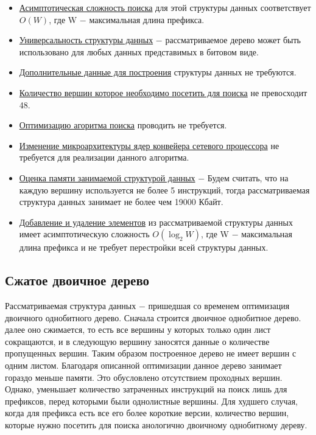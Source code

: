 \documentclass[a4peper, 12pt, titlepage, finall]{report}
\begin{document}
            \begin{itemize}
                \item\underline{Асимптотическая сложность поиска} для этой структуры данных соответствует {\ttfamily $O(W)$},
                где {\ttfamily W} $-$ максимальная длина префикса.
                \item\underline{Универсальность структуры данных} $-$ рассматриваемое дерево может быть использовано для любых данных представимых в битовом виде.
                \item\underline{Дополнительные данные для построения} структуры данных не требуются.
                \item\underline{Количество вершин которое необходимо посетить для поиска} не превосходит 48.
                \item\underline{Оптимизацию агоритма поиска} проводить не требуется.
                \item\underline{Изменение микроархитектуры ядер конвейера сетевого процессора} не требуется для реализации данного алгоритма.
                \item\underline{Оценка памяти занимаемой структурой данных} $-$ Будем считать, что на каждую вершину используется не более 5 инструкций,
                тогда рассматриваемая структура данных занимает не более чем 19000 Кбайт.
                \item\underline{Добавление и удаление элементов} из рассматриваемой структуры данных имеет асимптотическую сложность 
            {\ttfamily $O(\log_2{W})$}, где {\ttfamily W} $-$ максимальная длина префикса и не требует перестройки всей структуры данных.\\
            \end{itemize}

        \subsection{Сжатое двоичное дерево}
            Рассматриваемая структура данных $-$ пришедшая со временем оптимизация двоичного однобитного дерево. Сначала строится двоичное однобитное дерево.
            далее оно сжимается, то есть все вершины у которых только один лист сокращаются, и в следующую вершину заносятся данные о 
            количестве пропущенных вершин. Таким образом построенное дерево не имеет вершин с одним листом. Благодаря описанной оптимизации данное дерево
            занимает гораздо меньше памяти. Это обусловлено отсутствием проходных вершин. Однако, уменьшает количество затраченных инструкций на поиск лишь 
            для префиксов, перед которыми были однолистные вершины. Для худшего случая, когда для префикса есть все его более короткие версии, количество вершин, 
            которые нужно посетить для поиска анологично двоичному однобитному дереву.
\end{document}
